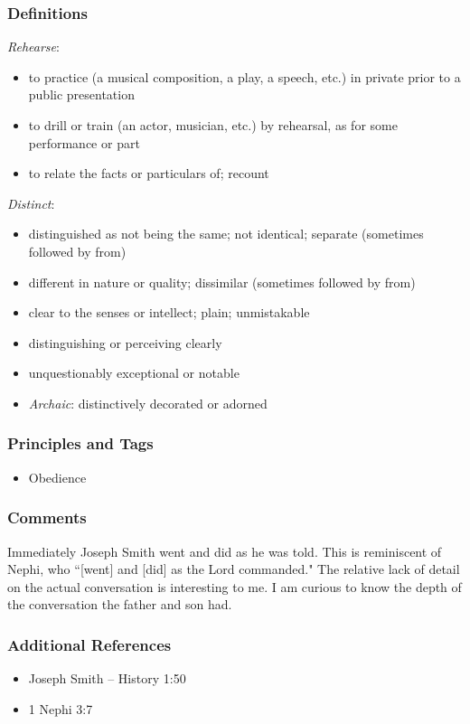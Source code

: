 \documentclass[12pt]{report}
\begin{document}
\subsubsection{Definitions\label{js:DFN17}}
\emph{Rehearse}: \begin{itemize}
\item to practice (a musical composition, a play, a speech, etc.) in private prior to a public presentation
\item to drill or train (an actor, musician, etc.) by rehearsal, as for some performance or part
\item to relate the facts or particulars of; recount
\end{itemize}
\emph{Distinct}: \begin{itemize}
\item distinguished as not being the same; not identical; separate (sometimes followed by from)
\item different in nature or quality; dissimilar (sometimes followed by from)
\item clear to the senses or intellect; plain; unmistakable
\item distinguishing or perceiving clearly
\item unquestionably exceptional or notable
\item \emph{Archaic}: distinctively decorated or adorned
\end{itemize}

\subsubsection{Principles and Tags\label{js:principles17}}
\begin{itemize}
\item {}Obedience
\end{itemize}

\subsubsection{Comments\label{js:comments17}}
Immediately Joseph Smith went and did as he was told.  This is reminiscent of Nephi, who ``[went] and [did] as the Lord commanded."  The relative lack of detail on the actual conversation is interesting to me.  I am curious to know the depth of the conversation the father and son had.  

\subsubsection{Additional References\label{js:references17}}
\begin{itemize}
\item Joseph Smith -- History 1:50
\item 1 Nephi 3:7
\end{itemize}
\end{document}
